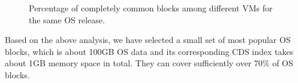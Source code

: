 
\begin{figure}
\centering
{}
\caption{Percentage of completely common blocks among different VMs for the same OS release.}
\label{fig:OSunchanged}
\end{figure}

Based on the above analysis, we have selected a small set of most popular
OS blocks, which is about 100GB OS data and its corresponding CDS index takes about 1GB memory space in total.
They can cover sufficiently over 70\% of OS blocks.








